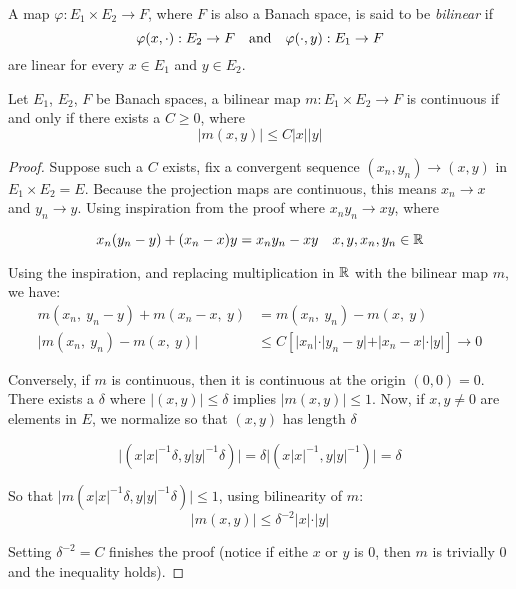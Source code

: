 \documentclass[../main-manifolds.tex]{subfiles}
\begin{document}
%
%

\newpage
{}
\begin{definition}
A map $\varphi: E_1\times E_2\to F$, where $F$ is also a Banach space, is said to be \emph{bilinear} if
\[
    \varphi(x,\cdot): E_2\to F\qqtext{and}\varphi(\cdot,y): E_1\to F
\]
are linear for every $x\in E_1$ and $y\in E_2$.     
\end{definition}


\begin{wts}\label{prop:characterization-of-continuity-bilinear-map}
    Let $E_1$, $E_2$, $F$ be Banach spaces, a bilinear map $m: E_1\times E_2\to F$ is continuous if and only if there exists a $C\geq 0$, where
    \begin{equation}\label{eq:continuity-bilinear-map}
        \vert m(x,y)\vert\leq C\vert x\vert\vert y\vert    
    \end{equation}
\end{wts}
\begin{proof}
    Suppose such a $C$ exists, fix a convergent sequence $(x_n, y_n)\to (x,y)$ in $E_1\times E_2 = E$. Because the projection maps are continuous, this means $x_n\to x$ and $y_n\to y$. Using inspiration from the proof where $x_ny_n\to xy$, where

    \[
        x_n(y_n-y) + (x_n-x)y = x_ny_n- xy\quad x,y,x_n,y_n\in\mathbb{R}
    \]

    Using the inspiration, and replacing multiplication in $\mathbb{R}$ with the bilinear map $m$, we have:
    \begin{align*}
        m(x_n,\: y_n-y) + m(x_n-x,\: y) &= m(x_n,\:y_n) - m(x,\:y)\\
        \vert m(x_n,\: y_n) - m(x,\: y)\vert &\leq C[\vert x_n\vert\cdot\vert y_n - y\vert + \vert x_n - x\vert\cdot\vert y\vert]\to 0
    \end{align*}

    Conversely, if $m$ is continuous, then it is continuous at the origin $(0,0)=0$. There exists a $\delta$ where $\vert (x,y)\vert \leq \delta$ implies $\vert m(x,y)\vert \leq 1$. Now, if $x,y\neq 0$ are elements in $E$, we normalize so that $(x,y)$ has length $\delta$

    \[
        \vert(x\vert x\vert^{-1}\delta,y\vert y\vert^{-1}\delta)\vert = \delta\vert(x\vert x\vert^{-1},y\vert y\vert^{-1})\vert = \delta
    \]

    So that $\vert m(x\vert x\vert^{-1}\delta, y\vert y\vert^{-1}\delta)\vert \leq 1$, using bilinearity of $m$:
    \[
        \vert m(x,y)\vert\leq \delta^{-2}\vert x\vert\cdot\vert y\vert
    \]

    Setting $\delta^{-2} = C$ finishes the proof (notice if eithe $x$ or $y$ is $0$, then $m$ is trivially $0$ and the inequality holds).
\end{proof}
\end{document}
